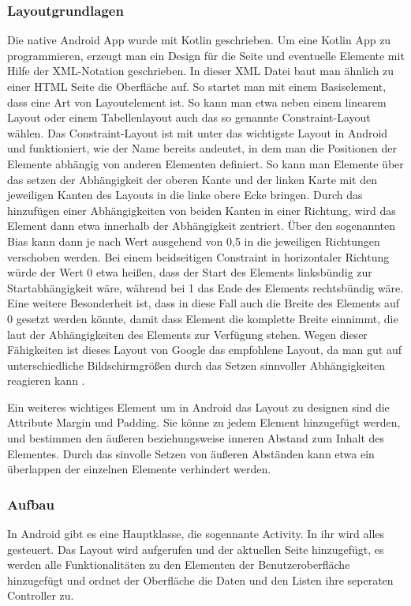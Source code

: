 \subsubsection{Layoutgrundlagen}
Die native Android App wurde mit Kotlin geschrieben. Um eine Kotlin App zu programmieren, erzeugt man ein Design für die Seite und eventuelle Elemente mit Hilfe der XML-Notation geschrieben.
In dieser XML Datei baut man ähnlich zu einer HTML Seite die Oberfläche auf. So startet man mit einem Basiselement, dass eine Art von Layoutelement ist. So kann man etwa neben einem linearem Layout oder einem Tabellenlayout auch das so genannte Constraint-Layout wählen. Das Constraint-Layout ist mit unter das wichtigste Layout in Android und funktioniert, wie der Name bereits andeutet, in dem man die Positionen der Elemente abhängig von anderen Elementen definiert. So kann man Elemente über das setzen der Abhängigkeit der oberen Kante und der linken Karte mit den jeweiligen Kanten des Layouts in die linke obere Ecke bringen. Durch das hinzufügen einer Abhängigkeiten von beiden Kanten in einer Richtung, wird das Element dann etwa innerhalb der Abhängigkeit zentriert. Über den sogenannten Bias kann dann je nach Wert ausgehend von 0,5 in die jeweiligen Richtungen verschoben werden. Bei einem beidseitigen Constraint in horizontaler Richtung würde der Wert 0 etwa heißen, dass der Start des Elements linksbündig zur Startabhängigkeit wäre, während bei 1 das Ende des Elements rechtsbündig wäre. Eine weitere Besonderheit ist, dass in diese Fall auch die Breite des Elements auf 0 gesetzt werden könnte, damit dass Element die komplette Breite einnimmt, die laut der Abhängigkeiten des Elements zur Verfügung stehen. Wegen dieser Fähigkeiten ist dieses Layout von Google das empfohlene Layout, da man gut auf unterschiedliche Bildschirmgrößen durch das Setzen sinnvoller Abhängigkeiten reagieren kann \cite{Google_Constraint_Layout}.

Ein weiteres wichtiges Element um in Android das Layout zu designen sind die Attribute Margin und Padding. Sie könne zu jedem Element hinzugefügt werden, und bestimmen den äußeren beziehungsweise inneren Abstand zum Inhalt des Elementes. Durch das sinvolle Setzen von äußeren Abständen kann etwa ein überlappen der einzelnen Elemente verhindert werden.

\subsubsection{Aufbau}
In Android gibt es eine Hauptklasse, die sogennante Activity. In ihr wird alles gesteuert. Das Layout wird aufgerufen und der aktuellen Seite hinzugefügt, es werden alle Funktionalitäten zu den Elementen der Benutzeroberfläche hinzugefügt und ordnet der Oberfläche die Daten und den Listen ihre seperaten Controller zu.

